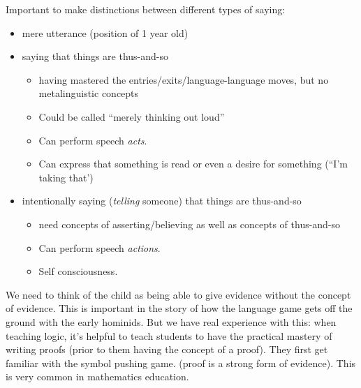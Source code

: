 Important to make distinctions between different types of saying:
\begin{itemize}
    \item mere utterance (position of 1 year old)
    \item saying that things are thus-and-so
     \begin{itemize}
        \item having mastered the entries/exits/language-language moves, but no metalinguistic concepts
        \item Could be called ``merely thinking out loud''
        \item Can perform speech \emph{acts}.
        \item Can express that something is read or even a desire for something (``I'm taking that')
     \end{itemize}
    \item intentionally saying (\emph{telling} someone) that things are thus-and-so
    \begin{itemize}
        \item need concepts of asserting/believing as well as concepts of thus-and-so
        \item Can perform speech \emph{actions}.
        \item Self consciousness.
    \end{itemize}
\end{itemize}

We need to think of the child as being able to give evidence without the concept of evidence. This is important in the story of how the language game gets off the ground with the early hominids. But we have real experience with this: when teaching logic, it's helpful to teach students to have the practical mastery of writing proofs (prior to them having the concept of a proof). They first get familiar with the symbol pushing game. (proof is a strong form of evidence). This is very common in mathematics education.

